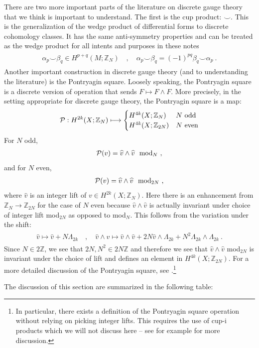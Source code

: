 \documentclass[11pt]{article}
\newcommand{\eq}[1]{\begin{align}\begin{split}#1\end{split}\end{align}}
\def\CP {{\cal P}}
\def\IZ{{\mathbb{Z}}}
\begin{document}
There are two more important parts of the literature on discrete gauge theory that we think is important to understand. The first is the cup product: $\smile$. This is the generalization of the wedge product of differential forms to discrete cohomology classes. It has the same anti-symmetry properties and can be treated as the wedge product for all intents and purposes in these notes
\eq{
\alpha_p\smile \beta_q\in H^{p+q}(M;\IZ_N)\quad, \quad \alpha_p\smile \beta_q=(-1)^{pq}\beta_q\smile \alpha_p~.
}
Another important construction in discrete gauge theory (and to understanding the literature) is the Pontryagin square. Loosely speaking, the Pontryagin square is a discrete version of operation that sends $F \mapsto F \wedge F$. More precisely, in the setting appropriate for discrete gauge theory, the Pontryagin square is a map:
\eq{
\CP:H^{2k}(X;\IZ_N)\longmapsto \begin{cases}
H^{4k}(X;\IZ_N) & N~{\rm odd}\\
H^{4k}(X; \IZ_{2N}) & N~{\rm even}
\end{cases}
}
For $N$ odd, 
\eq{\CP(v)=\widehat{v}\wedge \widehat{v}~~{\rm mod}_N~,}
and for $N$ even, 
\eq{
\CP(v)=\widehat{v}\wedge \widehat{v}~~ {\rm mod}_{2N}~,
}
where $\widehat{v}$ is an integer lift of $v\in H^{2k}(X;\IZ_N)$. Here there is an enhancement from $\IZ_N\to \IZ_{2N}$ for the case of $N$ even because $\widehat{v}\wedge \widehat{v}$ is  actually invariant under choice of integer lift mod$_{2N}$ as opposed to mod$_N$. This follows from the variation under the shift:
\eq{
\widehat{v}\longmapsto \widehat{v}+ N\Lambda_{2k}\quad, \quad \widehat{v}\wedge \widehat{v}\longmapsto \widehat{v}\wedge \widehat{v}+2N \widehat{v}\wedge \Lambda_{2k}+N^2\Lambda_{2k}\wedge \Lambda_{2k}~. 
}
Since $N\in 2\IZ$, we see that $2N,N^2\in 2N\IZ$ and therefore we see that $\widehat{v}\wedge \widehat{v}$ mod$_{2N}$ is invariant under the choice of lift and defines an element in $H^{4k}(X;\IZ_{2N})$. For a more detailed discussion of the Pontryagin square, see \cite{Kapustin:2013qsa,Hsin:2020nts}.\footnote{In particular, there exists a definition of the Pontryagin square operation without relying on picking integer lifts. This requires the use of cup-i products which we will not discuss here -- see \cite{Hsin:2020nts} for example for more discussion. }

The discussion of this section are summarized in the following table:
\end{document}
